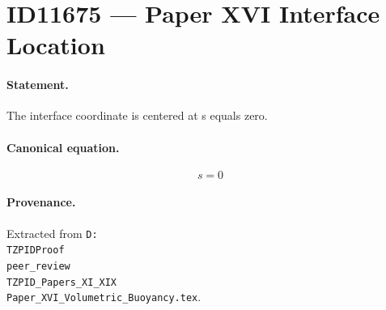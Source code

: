 \section*{ID11675 --- Paper XVI Interface Location}

\paragraph{Statement.}
The interface coordinate is centered at s equals zero.

\paragraph{Canonical equation.}
\[
s=0
\]

\paragraph{Provenance.}
Extracted from \texttt{D:\\TZPIDProof\\peer\_review\\TZPID\_Papers\_XI\_XIX\\Paper\_XVI\_Volumetric\_Buoyancy.tex}.
